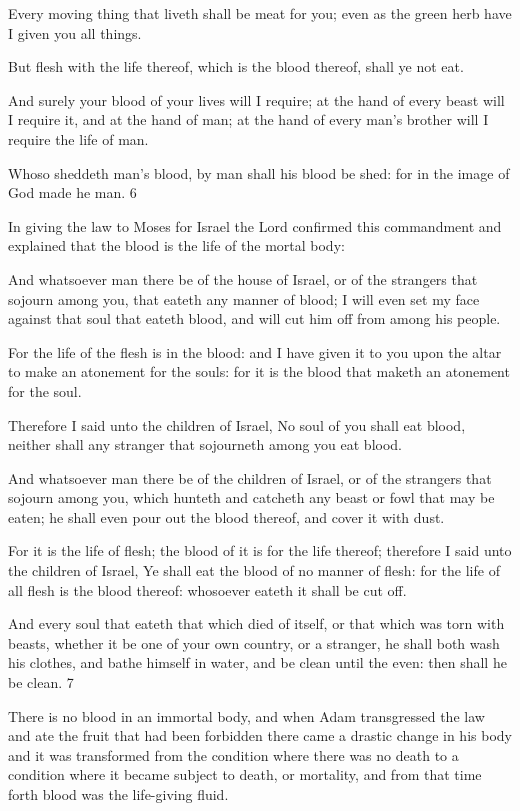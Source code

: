 Every moving thing that liveth shall be meat for you; even as the green herb have I given you
all things.

But flesh with the life thereof, which is the blood thereof, shall ye not eat.

And surely your blood of your lives will I require; at the hand of every beast will I require it,
and at the hand of man; at the hand of every man's brother will I require the life of man.

Whoso sheddeth man's blood, by man shall his blood be shed: for in the image of God made
he man. 6

In giving the law to Moses for Israel the Lord confirmed this commandment and explained
that the blood is the life of the mortal body:

And whatsoever man there be of the house of Israel, or of the strangers that sojourn among
you, that eateth any manner of blood; I will even set my face against that soul that eateth
blood, and will cut him off from among his people.

For the life of the flesh is in the blood: and I have given it to you upon the altar to make an
atonement for the souls: for it is the blood that maketh an atonement for the soul.

Therefore I said unto the children of Israel, No soul of you shall eat blood, neither shall any
stranger that sojourneth among you eat blood.

And whatsoever man there be of the children of Israel, or of the strangers that sojourn among
you, which hunteth and catcheth any beast or fowl that may be eaten; he shall even pour out
the blood thereof, and cover it with dust.

For it is the life of flesh; the blood of it is for the life thereof; therefore I said unto the
children of Israel, Ye shall eat the blood of no manner of flesh: for the life of all flesh is the
blood thereof: whosoever eateth it shall be cut off.

And every soul that eateth that which died of itself, or that which was torn with beasts,
whether it be one of your own country, or a stranger, he shall both wash his clothes, and
bathe himself in water, and be clean until the even: then shall he be clean. 7

There is no blood in an immortal body, and when Adam transgressed the law and ate the fruit
that had been forbidden there came a drastic change in his body and it was transformed from
the condition where there was no death to a condition where it became subject to death, or
mortality, and from that time forth blood was the life-giving fluid.

